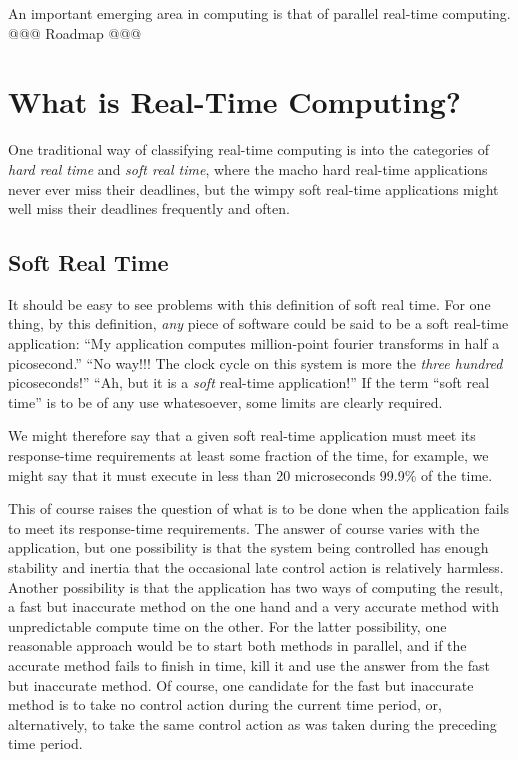 

An important emerging area in computing is that of parallel real-time
computing.
@@@ Roadmap @@@

\section{What is Real-Time Computing?}
\label{sec:rt:What is Real-Time Computing?}

One traditional way of classifying real-time computing is into the categories
of \emph{hard real time} and \emph{soft real time}, where the macho
hard real-time applications never ever miss their deadlines, but the
wimpy soft real-time applications might well miss their deadlines
frequently and often.

\subsection{Soft Real Time}
\label{sec:Soft Real Time}

It should be easy to see problems with this definition of soft real time.
For one thing, by this definition, \emph{any} piece of software could be
said to be a soft real-time application:
``My application computes million-point fourier transforms in half a
picosecond.''
``No way!!!
The clock cycle on this system is more the \emph{three hundred} picoseconds!''
``Ah, but it is a \emph{soft} real-time application!''
If the term ``soft real time'' is to be of any use whatesoever, some limits
are clearly required.

We might therefore say that a given soft real-time application must meet
its response-time requirements at least some fraction of the time, for
example, we might say that it must execute in less than 20 microseconds
99.9\% of the time.

This of course raises the question of what is to be done when the application
fails to meet its response-time requirements.
The answer of course varies with the application, but one possibility
is that the system being controlled has enough stability and inertia
that the occasional late control action is relatively harmless.
Another possibility is that the application has two ways of computing
the result, a fast but inaccurate method on the one hand and
a very accurate method with unpredictable compute time on the other.
For the latter possibility, one reasonable approach would be to start
both methods in parallel, and if the accurate method fails to finish
in time, kill it and use the answer from the fast but inaccurate method.
Of course, one candidate for the fast but inaccurate method is to take
no control action during the current time period, or, alternatively,
to take the same control action as was taken during the preceding time
period.

